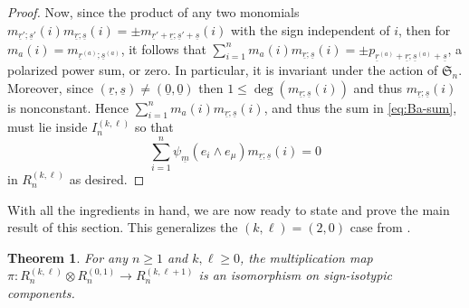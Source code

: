\documentclass[11pt, reqno]{amsart}
\newtheorem{theorem}{Theorem}[section]
\theoremstyle{definition}
\theoremstyle{remark}
\numberwithin{equation}{section}
\newcommand{\0}{\emptyset}
\renewcommand{\S}{\mathfrak{S}}
\newcommand{\m}{\underline{m}}
\renewcommand{\r}{\underline{r}}
\newcommand{\s}{\underline{s}}
\begin{document}
\begin{proof}
    Now, since the product of any two monomials $m_{\r';\s'}(i)m_{\r;\s}(i) = \pm m_{\r'+\r;\s'+\s}(i)$ with the sign independent of $i$, then for $m_a(i)= m_{\r^{(a)};\s^{(a)}}$, it follows that
    $\sum_{i=1}^n  m_a(i) m_{\r;\s}(i)=\pm p_{\r^{(a)}+\r; \s^{(a)}+\s}$, a polarized power sum, or zero. In particular, it is invariant under the action of $\S_n$. 
    Moreover, since $(\r,\s)\neq (\underline{0},\underline{0})$ then $1 \leq \deg(m_{\r;\s}(i))$ and thus $m_{\r;\s}(i)$ is nonconstant. Hence $\sum_{i=1}^n  m_a(i) m_{\r;\s}(i)$, and thus the sum in \eqref{eq:Ba-sum}, must lie inside $I_n^{(k,\ell)}$ so that 
    \[\sum_{i=1}^n \psi_{\m}(e_i \wedge e_\mu) m_{\r;\s}(i)=0\]
    in $R_n^{(k,\ell)}$ as desired.
\end{proof}

With all the ingredients in hand, we are now ready to state and prove the main result of this section. This generalizes the $(k,\ell) = (2,0)$ case from \cite{GLM}.

\begin{theorem}\label{thm:iso-sign}
    For any $n\geq 1$ and $k, \ell \geq 0$, the multiplication map $\pi: R_n^{(k,\ell)} \otimes R_n^{(0,1)} \to R_n^{(k,\ell+1)}$ is an isomorphism on sign-isotypic components. 
\end{theorem}
\end{document}
